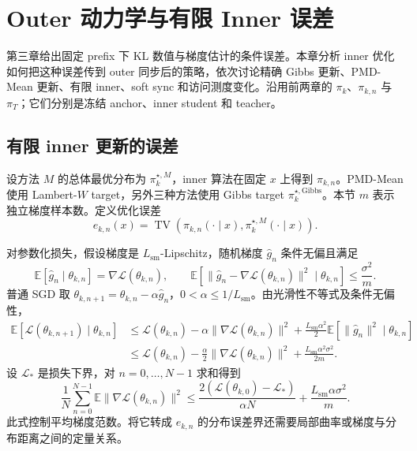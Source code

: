 \chapter{Outer 动力学与有限 Inner 误差}
\label{chap:outer-dynamics}

第三章给出固定 prefix 下 KL 数值与梯度估计的条件误差。本章分析 inner 优化如何把这种误差传到 outer 同步后的策略，依次讨论精确 Gibbs 更新、PMD-Mean 更新、有限 inner、soft sync 和访问测度变化。沿用前两章的 $\pi_k$、$\pi_{k,n}$ 与 $\pi_T$；它们分别是冻结 anchor、inner student 和 teacher。






\section{有限 inner 更新的误差}

设方法 $M$ 的总体最优分布为 $\pi_k^{\star,M}$，inner 算法在固定 $x$ 上得到 $\pi_{k,n}$。PMD-Mean 使用 Lambert-$W$ target，另外三种方法使用 Gibbs target $\pi_k^{\star,\mathrm{Gibbs}}$。本节 $m$ 表示独立梯度样本数。定义优化误差
\[
e_{k,n}(x)=\operatorname{TV}\!\left(\pi_{k,n}(\cdot\mid x),\pi_k^{\star,M}(\cdot\mid x)\right).
\]

对参数化损失，假设梯度是 $L_{\mathrm{sm}}$-Lipschitz，随机梯度 $\widehat g_n$ 条件无偏且满足
\[
\mathbb E[\widehat g_n\mid\theta_{k,n}]=\nabla\mathcal L(\theta_{k,n}),\qquad
\mathbb E\!\left[\|\widehat g_n-\nabla\mathcal L(\theta_{k,n})\|^2\mid\theta_{k,n}\right]\le\frac{\sigma^2}{m}.
\]
普通 SGD 取 $\theta_{k,n+1}=\theta_{k,n}-\alpha\widehat g_n$，$0<\alpha\le 1/L_{\mathrm{sm}}$。由光滑性不等式及条件无偏性，
\begin{align*}
\mathbb E[\mathcal L(\theta_{k,n+1})\mid\theta_{k,n}]
&\le\mathcal L(\theta_{k,n})-\alpha\|\nabla\mathcal L(\theta_{k,n})\|^2
+\frac{L_{\mathrm{sm}}\alpha^2}{2}\mathbb E[\|\widehat g_n\|^2\mid\theta_{k,n}]\\
&\le\mathcal L(\theta_{k,n})-\frac\alpha2\|\nabla\mathcal L(\theta_{k,n})\|^2
+\frac{L_{\mathrm{sm}}\alpha^2\sigma^2}{2m}.
\end{align*}
设 $\mathcal L_*$ 是损失下界，对 $n=0,\ldots,N-1$ 求和得到
\[
\frac1N\sum_{n=0}^{N-1}\mathbb E\|\nabla\mathcal L(\theta_{k,n})\|^2
\le\frac{2(\mathcal L(\theta_{k,0})-\mathcal L_*)}{\alpha N}
+\frac{L_{\mathrm{sm}}\alpha\sigma^2}{m}.
\]
此式控制平均梯度范数。将它转成 $e_{k,n}$ 的分布误差界还需要局部曲率或梯度与分布距离之间的定量关系。

